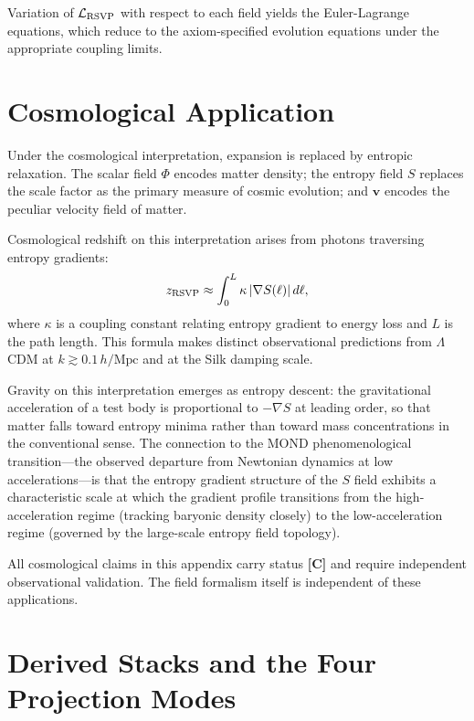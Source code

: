 Variation of $\mathcal{L}_{\rm RSVP}$ with respect to each field yields the
Euler-Lagrange equations, which reduce to the axiom-specified evolution equations
under the appropriate coupling limits.

\section{Cosmological Application}
\label{app:rsvp:cosmo}

\claimC Under the cosmological interpretation, expansion is replaced by entropic
relaxation. The scalar field $\Phi$ encodes matter density; the entropy field $S$
replaces the scale factor as the primary measure of cosmic evolution; and $\mathbf{v}$
encodes the peculiar velocity field of matter.

Cosmological redshift on this interpretation arises from photons traversing
entropy gradients:
\[
  z_{\rm RSVP} \approx \int_0^L \kappa\,|\nabla S(\ell)|\,d\ell,
\]
where $\kappa$ is a coupling constant relating entropy gradient to energy loss
and $L$ is the path length. This formula makes distinct observational predictions
from $\Lambda$CDM at $k \gtrsim 0.1\,h/\text{Mpc}$ and at the Silk damping scale.

\claimC Gravity on this interpretation emerges as entropy descent: the
gravitational acceleration of a test body is proportional to $-\nabla S$ at
leading order, so that matter falls toward entropy minima rather than toward
mass concentrations in the conventional sense. The connection to the MOND
phenomenological transition---the observed departure from Newtonian dynamics
at low accelerations---is that the entropy gradient structure of the $S$ field
exhibits a characteristic scale at which the gradient profile transitions from
the high-acceleration regime (tracking baryonic density closely) to the
low-acceleration regime (governed by the large-scale entropy field topology).

All cosmological claims in this appendix carry status \textbf{[C]} and require
independent observational validation. The field formalism itself is independent
of these applications.

\section{Derived Stacks and the Four Projection Modes}

